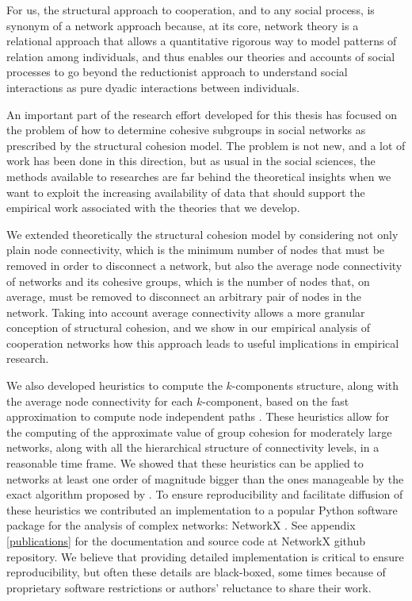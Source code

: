 For us, the structural approach to cooperation, and to any social process, is synonym of a network approach because, at its core, network theory is a relational approach that allows a quantitative rigorous way to model patterns of relation among individuals, and thus enables our theories and accounts of social processes to go beyond the reductionist approach to understand social interactions as pure dyadic interactions between individuals.

An important part of the research effort developed for this thesis has focused on the problem of how to determine cohesive subgroups in social networks as prescribed by the structural cohesion model. The problem is not new, and a lot of work has been done in this direction, but as usual in the social sciences, the methods available to researches are far behind the theoretical insights when we want to exploit the increasing availability of data that should support the empirical work associated with the theories that we develop.

We extended theoretically the structural cohesion model by considering not only plain node connectivity, which is the minimum number of nodes that must be removed in order to disconnect a network, but also the average node connectivity of networks and its cohesive groups, which is the number of nodes that, on average, must be removed to disconnect an arbitrary pair of nodes in the network. Taking into account average connectivity allows a more granular conception of structural cohesion, and we show in our empirical analysis of cooperation networks how this approach leads to useful implications in empirical research.

We also developed heuristics to compute the $k$-components structure, along with the average node connectivity for each $k$-component, based on the fast approximation to compute node independent paths \citep{white:2001b}. These heuristics allow for the computing of the approximate value of group cohesion for moderately large networks, along with all the hierarchical structure of connectivity levels, in a reasonable time frame. We showed that these heuristics can be applied to networks at least one order of magnitude bigger than the ones manageable by the exact algorithm proposed by \citet{moody:2003}. To ensure reproducibility and facilitate diffusion of these heuristics we contributed an implementation to a popular Python software package for the analysis of complex networks: NetworkX \citep{hagberg:2008}. See appendix \ref{publications} for the documentation and source code at NetworkX github repository. We believe that providing detailed implementation is critical to ensure reproducibility, but often these details are black-boxed, some times because of proprietary software restrictions or authors' reluctance to share their work.

